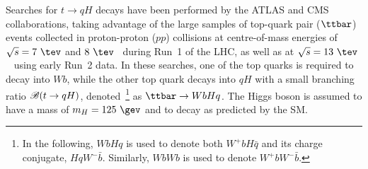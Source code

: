 Searches for $t \to qH$ decays have been performed by the ATLAS and CMS collaborations, taking advantage of the large samples
of top-quark pair ($\ttbar$) events collected in proton-proton ($pp$) collisions at centre-of-mass energies of $\sqrt{s}=7~\tev$ and $8~\tev$~\cite{Aad:2014dya,Aad:2015pja,Khachatryan:2016atv} during Run~1 of the LHC, as well as at $\sqrt{s}=13~\tev$~\cite{fcnc36} using early Run~2 data.
In these searches, one of the top quarks is required to decay into $Wb$, while the other top quark decays into $qH$ with a small branching ratio 
 $\mathscr{B}(t\to qH)$, denoted~\footnote{In the following, $WbHq$ is used to denote both $W^+b H\bar{q}$ and its charge conjugate, $HqW^- \bar{b}$. Similarly, 
$WbWb$ is used to denote $W^+b W^- \bar{b}$.} as $\ttbar \to WbHq$.  The Higgs boson is assumed to have a mass of $m_H=125~\gev$ and to decay as predicted by
the SM.
